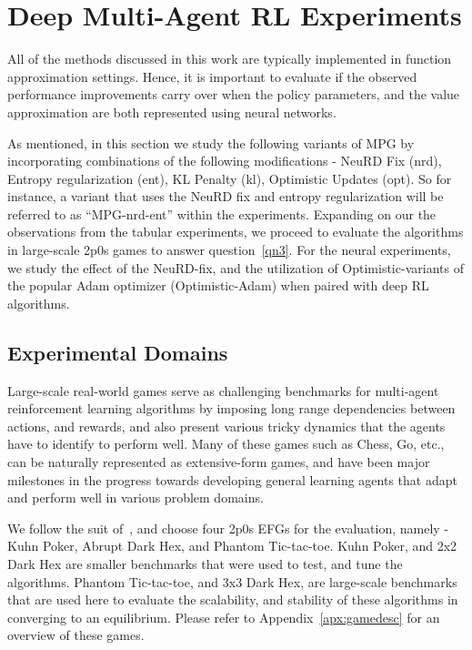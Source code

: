 \chapter{Deep Multi-Agent RL Experiments}
All of the methods discussed in this work are typically implemented in function approximation
settings.
Hence, it is important to evaluate if the observed performance improvements carry over when the
policy parameters, and the value approximation are both represented using neural networks.

As mentioned, in this section we study the following variants of MPG by incorporating combinations
of the following modifications - NeuRD Fix (nrd), Entropy regularization (ent), KL Penalty (kl),
Optimistic Updates (opt).
So for instance, a variant that uses the NeuRD fix and entropy regularization will be referred to
as ``MPG-nrd-ent'' within the experiments.
Expanding on our the observations from the tabular experiments, we proceed to evaluate the
algorithms in large-scale 2p0s games to answer question~\ref{qn3}.
For the neural experiments, we study the effect of the NeuRD-fix, and the utilization of
Optimistic-variants of the popular Adam optimizer (Optimistic-Adam) when paired with deep RL
algorithms.

\section{Experimental Domains}
Large-scale real-world games serve as challenging benchmarks for multi-agent reinforcement learning
algorithms by imposing long range dependencies between actions, and rewards, and also present
various tricky dynamics that the agents have to identify to perform well.
Many of these games such as Chess, Go, etc., can be naturally represented as extensive-form games,
and have been major milestones in the progress towards developing general learning agents that
adapt and perform well in various problem domains.

We follow the suit of~\cite{sokotaUnified2023}, and choose four 2p0s EFGs for the evaluation,
namely - Kuhn Poker, Abrupt Dark Hex, and Phantom Tic-tac-toe.
Kuhn Poker, and 2x2 Dark Hex are smaller benchmarks that were used to test, and tune the
algorithms.
Phantom Tic-tac-toe, and 3x3 Dark Hex, are large-scale benchmarks that are used here to evaluate
the scalability, and stability of these algorithms in converging to an equilibrium.
Please refer to Appendix~\ref{apx:gamedesc} for an overview of these games.

